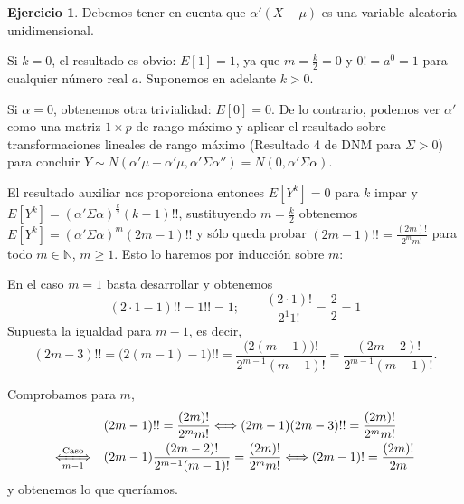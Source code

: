 \documentclass[12pt,spanish]{article}
\theoremstyle{definition}
\newtheorem{exercise}{Ejercicio}
\begin{document}
\begin{exercise} %

  Debemos tener en cuenta que $\alpha'(X-\mu)$ es una variable
  aleatoria unidimensional.
  
  Si $k=0$, el resultado es obvio: $E[1]=1$, ya que $m=\frac{k}{2}=0$
  y $0!=a^0=1$ para cualquier número real $a$. Suponemos en adelante
  $k>0$.
  
  Si $\alpha=0$, obtenemos otra trivialidad: $E[0]=0$. De lo
  contrario, podemos ver $\alpha'$ como una matriz $1\times p$ de
  rango máximo y aplicar el resultado sobre transformaciones lineales
  de rango máximo (Resultado 4 de DNM para $\Sigma>0$) para concluir
  $Y\sim
  N(\alpha'\mu-\alpha'\mu,\alpha'\Sigma\alpha'')=N(0,\alpha'\Sigma\alpha)$.
  
  El resultado auxiliar nos proporciona entonces $E[Y^k]=0$ para $k$
  impar y \\ $E[Y^k]=(\alpha'\Sigma\alpha)^\frac{k}{2} (k-1)!!$,
  sustituyendo $m=\frac{k}{2}$ obtenemos
  $E[Y^k]=(\alpha'\Sigma\alpha)^m (2m-1)!!$ y sólo queda probar
  $(2m-1)!!=\frac{(2m)!}{2^m m!}$ para todo $m\in\mathbb{N}$,
  $m\geq 1$. Esto lo haremos por inducción sobre $m$:
  
  En el caso $m=1$ basta desarrollar y obtenemos
  \[(2\cdot 1-1)!!=1!!=1;\qquad \frac{(2\cdot 1)!}{2^1
      1!}=\frac{2}{2}=1\] Supuesta la igualdad para $m-1$, es decir,
  \[(2m-3)!!=\big(2(m-1)-1\big)!!=\frac{\big(2(m-1)\big)!}{2^{m-1} (m-1)!}=\frac{(2m-2)!}{2^{m-1} (m-1)!}.\]

  Comprobamos para $m$,
  \begin{align*}
    &(2m-1)!!=\frac{(2m)!}{2^m m!}
      \Longleftrightarrow (2m-1)(2m-3)!!=\frac{(2m)!}{2^m m!} \\
    \xLeftrightarrow[m-1]{\text{Caso}}\quad &(2m-1)\frac{(2m-2)!}{2^{m-1}(m-1)!}=\frac{(2m)!}{2^m m!} \Longleftrightarrow (2m-1)!=\frac{(2m)!}{2m}
  \end{align*}
  y obtenemos lo que queríamos.
  
\end{exercise}
\end{document}
